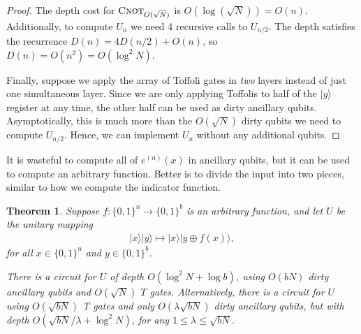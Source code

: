 \documentclass[a4paper,onecolumn,10pt,accepted=2024-05-22]{quantumarticle}
\newcommand{\ket}[1]{| #1\rangle}        %
\newtheorem{theorem}{Theorem}
\begin{document}
\begin{proof}
		The depth cost for $\textsc{Cnot}_{O(\sqrt{N})}$ is $O(\log(\sqrt{N})) = O(n)$. Additionally, to compute $U_n$ we need 4 recursive calls to $U_{n/2}$. The depth satisfies the recurrence $D(n) = 4D(n/2) + O(n)$, so $D(n) = O(n^2) = O(\log^2 N)$.
		
		Finally, suppose we apply the array of Toffoli gates in \emph{two} layers instead of just one simultaneous layer. Since we are only applying Toffolis to half of the $\ket{y}$ register at any time, the other half can be used as dirty ancillary qubits. Asymptotically, this is much more than the $O(\sqrt{N})$ dirty qubits we need to compute $U_{n/2}$. Hence, we can implement $U_n$ without any additional qubits.
	\end{proof}
	
	It is wasteful to compute all of $e^{(n)}(x)$ in ancillary qubits, but it can be used to compute an arbitrary function. Better is to divide the input into two pieces,  similar to how we compute the indicator function.
	\begin{theorem}
		Suppose $f \colon \{ 0, 1 \}^{n} \to \{ 0, 1 \}^{b}$ is an arbitrary function, and let $U$ be the unitary mapping
		\begin{align}
		\ket{x} \ket{y} \mapsto \ket{x} \ket{y \oplus f(x)},
		\end{align}
		for all $x \in \{ 0, 1 \}^{n}$ and $y \in \{ 0, 1 \}^{b}$. 
		
		There is a circuit for $U$ of depth $O(\log^2 N + \log b)$, using $O(bN)$ dirty ancillary qubits and $O(\sqrt{N})$ $T$ gates. Alternatively, there is a circuit for $U$ using $O(\sqrt{bN})$ \textsc{T} gates and only $O(\lambda \sqrt{bN})$ dirty ancillary qubits, but with depth $O(\sqrt{bN} / \lambda + \log^2 N)$, for any $1 \leq \lambda \leq \sqrt{bN}$. 
	\end{theorem}
\end{document}

